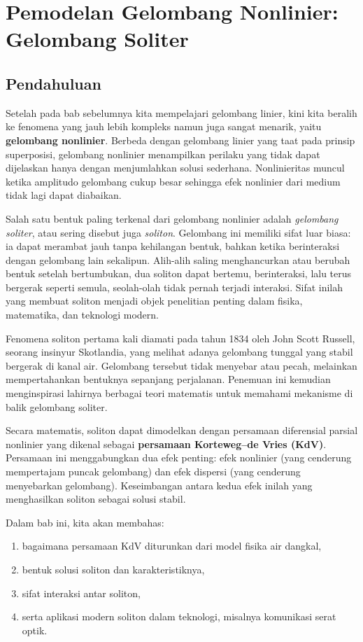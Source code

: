 \documentclass{bukumjh}
\begin{document}
\chapter{Pemodelan Gelombang Nonlinier: Gelombang Soliter}

\section{Pendahuluan}

Setelah pada bab sebelumnya kita mempelajari gelombang linier, kini kita beralih ke fenomena yang jauh lebih kompleks namun juga sangat menarik, yaitu \textbf{gelombang nonlinier}. 
Berbeda dengan gelombang linier yang taat pada prinsip superposisi, gelombang nonlinier menampilkan perilaku yang tidak dapat dijelaskan hanya dengan menjumlahkan solusi sederhana. 
Nonlinieritas muncul ketika amplitudo gelombang cukup besar sehingga efek nonlinier dari medium tidak lagi dapat diabaikan.

Salah satu bentuk paling terkenal dari gelombang nonlinier adalah \emph{gelombang soliter}, atau sering disebut juga \emph{soliton}. 
Gelombang ini memiliki sifat luar biasa: ia dapat merambat jauh tanpa kehilangan bentuk, bahkan ketika berinteraksi dengan gelombang lain sekalipun. 
Alih-alih saling menghancurkan atau berubah bentuk setelah bertumbukan, dua soliton dapat bertemu, berinteraksi, lalu terus bergerak seperti semula, seolah-olah tidak pernah terjadi interaksi. 
Sifat inilah yang membuat soliton menjadi objek penelitian penting dalam fisika, matematika, dan teknologi modern.

Fenomena soliton pertama kali diamati pada tahun 1834 oleh John Scott Russell, seorang insinyur Skotlandia, yang melihat adanya gelombang tunggal yang stabil bergerak di kanal air. 
Gelombang tersebut tidak menyebar atau pecah, melainkan mempertahankan bentuknya sepanjang perjalanan. 
Penemuan ini kemudian menginspirasi lahirnya berbagai teori matematis untuk memahami mekanisme di balik gelombang soliter.

Secara matematis, soliton dapat dimodelkan dengan persamaan diferensial parsial nonlinier yang dikenal sebagai \textbf{persamaan Korteweg–de Vries (KdV)}. 
Persamaan ini menggabungkan dua efek penting: efek nonlinier (yang cenderung mempertajam puncak gelombang) dan efek dispersi (yang cenderung menyebarkan gelombang). 
Keseimbangan antara kedua efek inilah yang menghasilkan soliton sebagai solusi stabil.

Dalam bab ini, kita akan membahas:
\begin{enumerate}
  \item bagaimana persamaan KdV diturunkan dari model fisika air dangkal,
  \item bentuk solusi soliton dan karakteristiknya,
  \item sifat interaksi antar soliton,
  \item serta aplikasi modern soliton dalam teknologi, misalnya komunikasi serat optik.
\end{enumerate}
\end{document}
